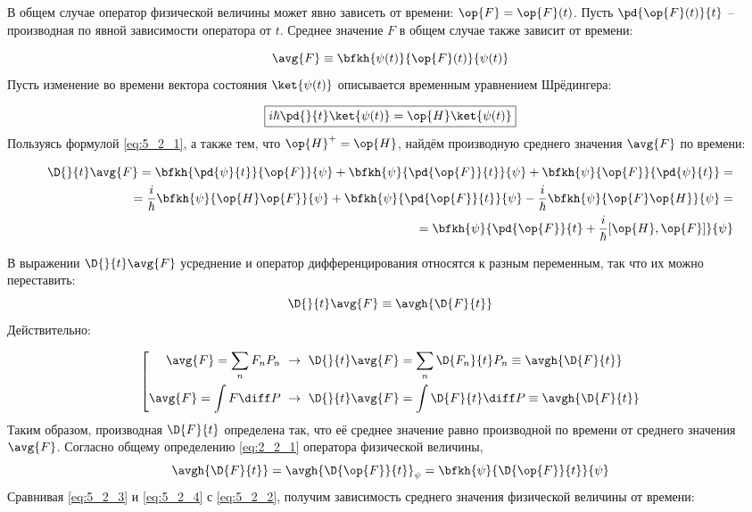 В общем случае оператор физической величины может явно зависеть от времени: $\op{F}=\op{F}(t)$. Пусть $\pd{\op{F}(t)}{t}$ -- производная по явной зависимости оператора от $t$. Среднее значение $F$ в общем случае также зависит от времени:

$$
  \avg{F} \equiv \bfkh{\psi(t)}{\op{F}(t)}{\psi(t)}
$$%
%
Пусть изменение во времени вектора состояния $\ket{\psi(t)}$ описывается временным уравнением Шрёдингера\footnotemark:


\begin{equation}
  \label{eq:5_2_1}
  \boxed{
    i\hbar\pd{}{t}\ket{\psi(t)} = \op{H}\ket{\psi(t)}
  }
\end{equation}%
%
Пользуясь формулой \eqref{eq:5_2_1}, а также тем, что $\op{H}^+=\op{H}$, найдём производную среднего значения $\avg{F}$ по времени:

\begin{equation}
  \begin{split}
    \label{eq:5_2_2}
    \D{}{t} \avg{F} = \bfkh{\pd{\psi}{t}}{\op{F}}{\psi} 
        + \bfkh{\psi}{\pd{\op{F}}{t}}{\psi} + \bfkh{\psi}{\op{F}}{\pd{\psi}{t}} = \\ =
    \frac{i}{\hbar}\bfkh{\psi}{\op{H}\op{F}}{\psi} + \bfkh{\psi}{\pd{\op{F}}{t}}{\psi} -
        \frac{i}{\hbar}\bfkh{\psi}{\op{F}\op{H}}{\psi} = \\ =
    \bfkh{\psi}{\pd{\op{F}}{t}+\frac{i}{\hbar}[\op{H},\op{F}]}{\psi}
  \end{split}
\end{equation}

В выражении $\D{}{t} \avg{F}$ усреднение и оператор дифференцирования относятся к разным переменным, так что их можно переставить:
\begin{equation}
  \label{eq:5_2_3}
  \D{}{t} \avg{F} \equiv \avgh{\D{F}{t}}
\end{equation}%
%
Действительно:

$$
\left[
\begin{gathered}
  \avg{F} = \sum_n F_n P_n ~\rightarrow~ \D{}{t}\avg{F} =
    \sum_n \D{F_n}{t} P_n \equiv \avgh{\D{F}{t}}\\
  \avg{F} = \int F\diff P ~\rightarrow~ \D{}{t}\avg{F} =
    \int \D{F}{t}\diff P \equiv \avgh{\D{F}{t}}\\
\end{gathered}
\right.
$$%
%
Таким образом, производная $\D{F}{t}$ определена так, что её среднее значение равно производной по времени от среднего значения $\avg{F}$. Согласно общему определению \eqref{eq:2_2_1} оператора физической величины,
\begin{equation}
  \label{eq:5_2_4}
  \avgh{\D{F}{t}} = \avgh{\D{\op{F}}{t}}_{\psi} =
    \bfkh{\psi}{\D{\op{F}}{t}}{\psi}
\end{equation}%
%
Сравнивая \eqref{eq:5_2_3} и \eqref{eq:5_2_4} с \eqref{eq:5_2_2}, получим зависимость среднего значения физической величины от времени:

